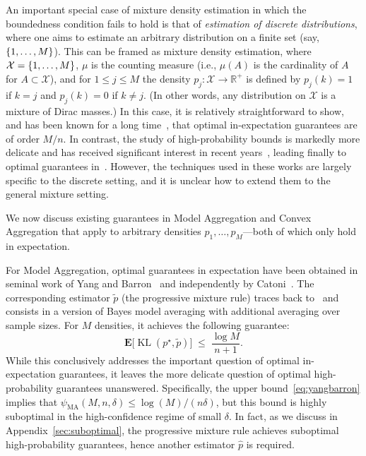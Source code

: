 \documentclass[11pt]{article}
\makeatletter
\newcommand{\R}{\mathbb R}
\newcommand{\E}{{\mathbf E}}
\renewcommand{\leq}{\leqslant}
\renewcommand{\le}{\leqslant}
\newcommand{\wt}{\widetilde}
\newcommand{\wh}{\widehat}
\newcommand{\M}{M}
\newcommand{\X}{\mathcal{X}}
\newcommand{\ie}{i.e.\@\xspace}
\newcommand{\kl}{\operatorname{KL}}
\theoremstyle{definition}
\theoremstyle{remark}
\DeclarePairedDelimiter{\set}{\{}{\}}
\makeatother
\begin{document}
An important special case of mixture density estimation in which the boundedness condition fails to hold is that of \emph{estimation of discrete distributions}, where one aims to estimate an arbitrary distribution on a finite set (say, $\set{1, \dots, M}$).
This can be framed as mixture density estimation, where $\X = \set{1, \dots, M}$, $\mu$ is the counting measure (\ie, $\mu (A)$ is the cardinality of $A$ for $A \subset \X$), and for $1 \leq j \leq M$ the density $p_j : \X \to \R^+$ is defined by $p_j (k) = 1$ if $k = j$ and $p_j (k) = 0$ if $k \neq j$.
(In other words, any distribution on $\X$ is a mixture of Dirac masses.)
In this case, it is relatively straightforward to show, and has been known for a long time~\cite{catoni1997mixture,forster2002relative,braess2004bernstein,mourtada2019improper}, that optimal in-expectation guarantees are of order $\M/n$.
In contrast, the study of high-probability bounds is markedly more delicate and has received significant interest in recent years~\cite{bhattacharyya2021near,han2023optimal,canonne2023concentration,vanderhoeven2023high,mourtada2025estimation,van2025nearly}, leading finally to optimal guarantees in~\cite{mourtada2025estimation}.
However, the techniques used in these works are largely specific to the discrete setting, and
it is unclear how to extend them to the general mixture setting.

We now discuss existing guarantees in Model Aggregation and Convex Aggregation that apply to arbitrary densities $p_1, \dots, p_\M$---both of which only hold in expectation.

For Model Aggregation, optimal guarantees in expectation have been obtained in seminal work of Yang and Barron~\cite{yang1999information,yang2000mixing} and independently by Catoni~\cite{catoni1997mixture,catoni2004statistical}.
The corresponding estimator $\wt p$ (the progressive mixture rule) traces back to~\cite{barron1987bayes} and consists in a version of Bayes model averaging with additional averaging over sample sizes.
For $\M$ densities, it achieves the following guarantee:
\begin{equation}
    \label{eq:yangbarron}
    \E\big[\kl(p^\star,\widetilde{p})\big]\;\le\;\frac{\log \M}{n+1}.
\end{equation}
While this conclusively addresses the important question of optimal in-expectation guarantees, it leaves the more delicate question of optimal high-probability guarantees unanswered.
Specifically, the upper bound~\eqref{eq:yangbarron} implies that $\psi_{\mathrm{MA}} (M, n, \delta) \leq \log(M)/(n \delta)$, but this bound is highly suboptimal in the high-confidence regime of small $\delta$.
In fact, as we discuss in Appendix~\ref{sec:suboptimal}, the progressive mixture rule achieves suboptimal high-probability guarantees, hence another estimator $\wh p$ is required.
\end{document}
